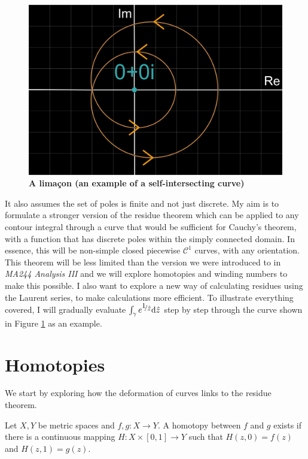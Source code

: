 \documentclass[a4paper]{article}
\def\nicefrac#1#2{%
    \raise.5ex\hbox{\begin{footnotesize}$#1$\end{footnotesize}}%
    \kern-.15em/\kern-.035em%
    \lower.25ex\hbox{\begin{footnotesize}$#2$\end{footnotesize}}}
\begin{document}
\begin{figure}[h!]
\begin{center}
\includegraphics[scale=0.15]{limaconint3}
\end{center}
\caption{\textbf{A limaçon (an example of a self-intersecting curve)}}
\label{fig:limacon}
\end{figure}

It also assumes the set of poles is finite and not just discrete. My aim is to formulate a stronger version of the residue theorem which can be applied to any contour integral through a curve that would be sufficient for Cauchy's theorem, with a function that has discrete poles within the simply connected domain. In essence, this will be non-simple closed piecewise $\mathcal{C}^1$ curves, with any orientation. This theorem will be less limited than the version we were introduced to in \textit{MA244 Analysis III} and we will explore homotopies and winding numbers to make this possible. I also want to explore a new way of calculating residues using the Laurent series, to make calculations more efficient. To illustrate everything covered, I will gradually evaluate $\int_\gamma { e^{\nicefrac{1}{\hat{z}}} \dd\hat{z}}$ step by step through the curve shown in Figure \ref{fig:limacon} as an example.


\section{Homotopies}

We start by exploring how the deformation of curves links to the residue theorem. 

\begin{definition}{\citep[p.19]{Roe}}{}
Let $X,Y$ be metric spaces and $f,g : X \rightarrow Y$. A homotopy between $f$ and $g$ exists if there is a continuous mapping $H : X \times [0,1] \rightarrow Y $ such that $H(z,0) = f(z)$ and $H(z,1)=g(z)$.  
\end{definition}
\end{document}
